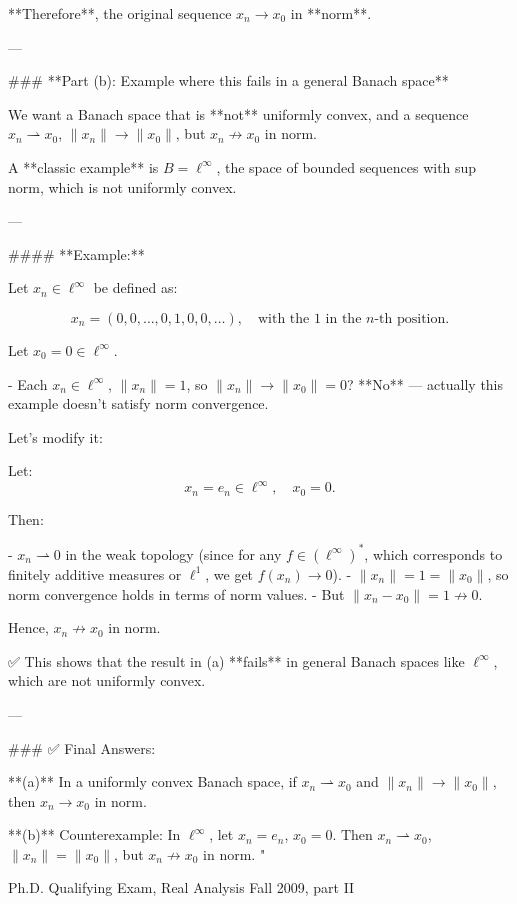 **Therefore**, the original sequence \( x_n \to x_0 \) in **norm**.

---

### **Part (b): Example where this fails in a general Banach space**

We want a Banach space that is **not** uniformly convex, and a sequence \( x_n \rightharpoonup x_0 \), \( \|x_n\| \to \|x_0\| \), but \( x_n \not\to x_0 \) in norm.

A **classic example** is \( B = \ell^\infty \), the space of bounded sequences with sup norm, which is not uniformly convex.

---

#### **Example:**

Let \( x_n \in \ell^\infty \) be defined as:

\[
x_n = (0, 0, \dots, 0, 1, 0, 0, \dots), \quad \text{with the 1 in the } n\text{-th position}.
\]

Let \( x_0 = 0 \in \ell^\infty \).

- Each \( x_n \in \ell^\infty \), \( \|x_n\| = 1 \), so \( \|x_n\| \to \|x_0\| = 0 \)? **No** — actually this example doesn't satisfy norm convergence.
  
Let's modify it:

Let:
\[
x_n = e_n \in \ell^\infty, \quad x_0 = 0.
\]

Then:

- \( x_n \rightharpoonup 0 \) in the weak topology (since for any \( f \in (\ell^\infty)^* \), which corresponds to finitely additive measures or \( \ell^1 \), we get \( f(x_n) \to 0 \)).
- \( \|x_n\| = 1 = \|x_0\| \), so norm convergence holds in terms of norm values.
- But \( \|x_n - x_0\| = 1 \not\to 0 \).

Hence, \( x_n \not\to x_0 \) in norm.

✅ This shows that the result in (a) **fails** in general Banach spaces like \( \ell^\infty \), which are not uniformly convex.

---

### ✅ Final Answers:

**(a)** In a uniformly convex Banach space, if \( x_n \rightharpoonup x_0 \) and \( \|x_n\| \to \|x_0\| \), then \( x_n \to x_0 \) in norm.

**(b)** Counterexample: In \( \ell^\infty \), let \( x_n = e_n \), \( x_0 = 0 \). Then \( x_n \rightharpoonup x_0 \), \( \|x_n\| = \|x_0\| \), but \( x_n \not\to x_0 \) in norm.
"

Ph.D. Qualifying Exam, Real Analysis
Fall 2009, part II

